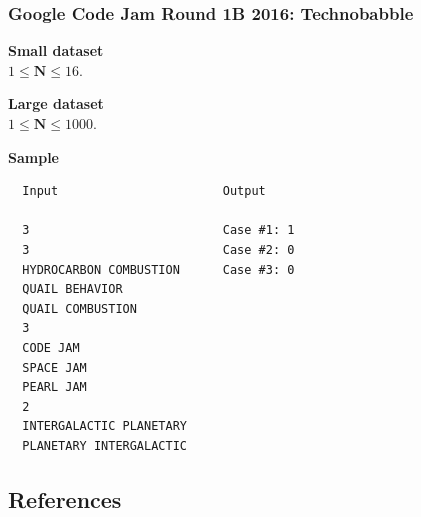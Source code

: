\documentclass{beamer}
\begin{document}
\begin{frame}[fragile]
\frametitle{Google Code Jam Round 1B 2016: Technobabble}
\scriptsize

\textbf{Small dataset}\\
\vspace{0.1cm}
$1 \le \textbf{N} \le 16$.\\

\vspace{0.2cm}

\textbf{Large dataset}\\
\vspace{0.1cm}
$1 \le \textbf{N} \le 1000$.\\

\vspace{0.2cm}

\textbf{Sample}
\begin{center}
\begin{verbatim}
  Input                       Output

  3                           Case #1: 1
  3                           Case #2: 0
  HYDROCARBON COMBUSTION      Case #3: 0
  QUAIL BEHAVIOR
  QUAIL COMBUSTION
  3
  CODE JAM
  SPACE JAM
  PEARL JAM
  2
  INTERGALACTIC PLANETARY
  PLANETARY INTERGALACTIC
\end{verbatim}
\end{center}
\end{frame}

\subsection{References}
\end{document}
